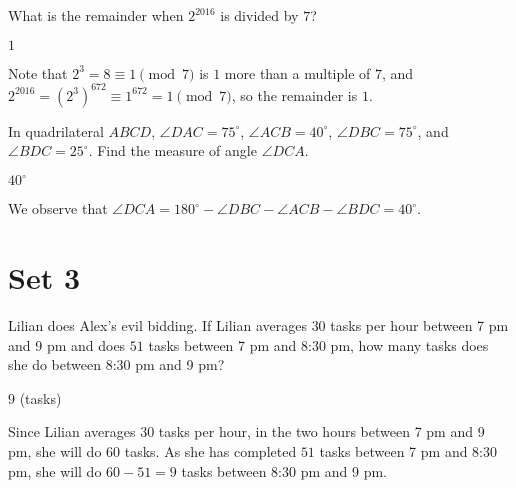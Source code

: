 \documentclass[11pt]{article}
\begin{document}
\begin{problem}%
What is the remainder when $2^{2016}$ is divided by $7$?
\end{problem}

\begin{answer}
$\boxed{1}$
\end{answer}

\begin{solution}
Note that $2^3 = 8 \equiv 1 \pmod{7}$ is $1$ more than a multiple of $7$, and $2^{2016} = (2^3)^{672} \equiv 1^{672} = 1 \pmod{7}$, so the remainder is $\boxed{1}$.
\end{solution}


\begin{problem}%
In quadrilateral $ABCD$, $\angle DAC = 75^\circ$, $\angle ACB = 40^\circ$, $\angle DBC = 75^\circ$, and $\angle BDC = 25^\circ$. Find the measure of angle $\angle DCA$.
\end{problem}

\begin{answer}
$\boxed{40^\circ}$
\end{answer}

\begin{solution}
We observe that $\angle DCA = 180^\circ - \angle DBC - \angle ACB - \angle BDC = 40^\circ$.
\end{solution}

\newpage

\section*{Set 3}

\begin{problem}%
Lilian does Alex's evil bidding. If Lilian averages $30$ tasks per hour between 7 pm and 9 pm and does $51$ tasks between 7 pm and 8:30 pm, how many tasks does she do between 8:30 pm and 9 pm?
\end{problem}

\begin{answer}
$\boxed{9}$ (tasks)
\end{answer}

\begin{solution}
Since Lilian averages $30$ tasks per hour, in the two hours between 7 pm and 9 pm, she will do $60$ tasks. As she has completed $51$ tasks between 7 pm and 8:30 pm, she will do $60 - 51 = \boxed{9}$ tasks between 8:30 pm and 9 pm.
\end{solution}
\end{document}
